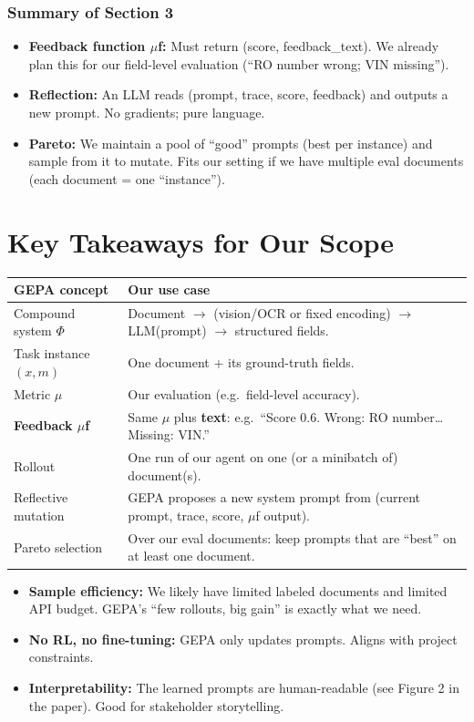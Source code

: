 \documentclass[11pt,a4paper]{article}
\begin{document}
\subsubsection{Summary of Section 3}

\begin{itemize}
  \item \textbf{Feedback function $\mu$f:} Must return (score, feedback\_text). We already plan this for our field-level evaluation (``RO number wrong; VIN missing'').
  \item \textbf{Reflection:} An LLM reads (prompt, trace, score, feedback) and outputs a new prompt. No gradients; pure language.
  \item \textbf{Pareto:} We maintain a pool of ``good'' prompts (best per instance) and sample from it to mutate. Fits our setting if we have multiple eval documents (each document = one ``instance'').
\end{itemize}

\section{Key Takeaways for Our Scope}

\begin{center}
\begin{tabular}{@{}ll@{}}
\toprule
\textbf{GEPA concept} & \textbf{Our use case} \\
\midrule
Compound system $\Phi$ & Document $\to$ (vision/OCR or fixed encoding) $\to$ LLM(prompt) $\to$ structured fields. \\
Task instance $(x,m)$ & One document + its ground-truth fields. \\
Metric $\mu$ & Our evaluation (e.g.\ field-level accuracy). \\
\textbf{Feedback $\mu$f} & Same $\mu$ plus \textbf{text}: e.g.\ ``Score 0.6. Wrong: RO number\ldots Missing: VIN.'' \\
Rollout & One run of our agent on one (or a minibatch of) document(s). \\
Reflective mutation & GEPA proposes a new system prompt from (current prompt, trace, score, $\mu$f output). \\
Pareto selection & Over our eval documents: keep prompts that are ``best'' on at least one document. \\
\bottomrule
\end{tabular}
\end{center}

\begin{itemize}
  \item \textbf{Sample efficiency:} We likely have limited labeled documents and limited API budget. GEPA's ``few rollouts, big gain'' is exactly what we need.
  \item \textbf{No RL, no fine-tuning:} GEPA only updates prompts. Aligns with project constraints.
  \item \textbf{Interpretability:} The learned prompts are human-readable (see Figure 2 in the paper). Good for stakeholder storytelling.
\end{itemize}
\end{document}
